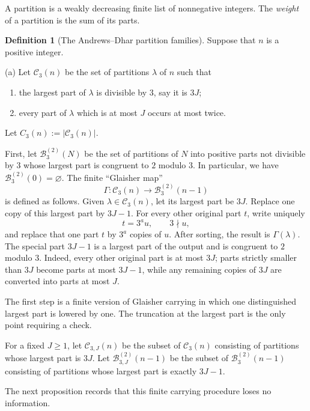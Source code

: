 \documentclass[11pt]{amsart}
\theoremstyle{definition}
\newtheorem*{definition}{Definition}
\theoremstyle{remark}
\newcommand{\C}{\mathcal C}
\newcommand{\B}{\mathcal B}
\begin{document}
A partition is a weakly decreasing finite list of nonnegative integers.  The \emph{weight} of a partition is the sum of its parts.

\begin{definition}[The Andrews--Dhar partition families]\label{def:families}
Suppose that $n$ is a positive integer.

\smallskip
\noindent
(a) Let $\C_3(n)$ be the set of partitions $\lambda$ of $n$ such that
\begin{enumerate}[label=(\roman*)]
\item the largest part of $\lambda$ is divisible by $3$, say it is $3J$;
\item every part of $\lambda$ which is at most $J$ occurs at most twice.
\end{enumerate}
Let $C_3(n):=|\C_3(n)|$.
\end{definition}

First, let $\B_3^{(2)}(N)$ be the set of partitions of $N$ into positive parts not divisible by $3$ whose largest part is congruent to $2$ modulo $3$. In  particular, we have $\B_3^{(2)}(0)=\varnothing$.  The finite ``Glaisher map''
\begin{equation}
        \Gamma:\C_3(n)\longrightarrow \B_3^{(2)}(n-1)
\end{equation}
is defined as follows.  Given $\lambda\in\C_3(n)$, let its largest part be $3J$.  Replace one copy of this largest part by $3J-1$.  For every other original part $t$, write uniquely
\[
       t=3^a u,\qquad 3\nmid u,
\]
and replace that one part $t$ by $3^a$ copies of $u$.  After sorting, the result is $\Gamma(\lambda)$.  The special part \(3J-1\) is a largest part of the output and is congruent
to \(2\) modulo \(3\). Indeed, every other original part is at most \(3J\);
parts strictly smaller than \(3J\) become parts at most \(3J-1\), while any
remaining copies of \(3J\) are converted into parts at most \(J\).

The first step is a finite version of Glaisher carrying in which one distinguished largest part is lowered by one.  The truncation at the largest part is the only point requiring a check.

For a fixed $J\ge1$, let $\C_{3,J}(n)$ be the subset of $\C_3(n)$ consisting of partitions whose largest part is $3J$.  Let $\B_{3,J}^{(2)}(n-1)$ be the subset of $\B_3^{(2)}(n-1)$ consisting of partitions whose largest part is exactly $3J-1$.

The next proposition records that this finite carrying procedure loses no information.
\end{document}
